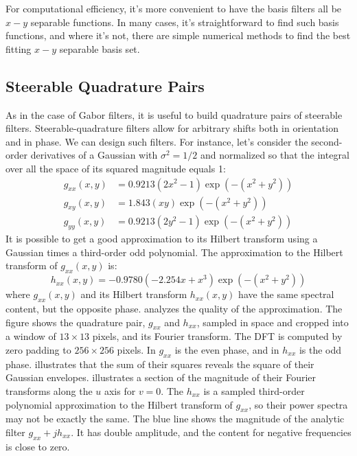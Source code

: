 For computational efficiency, it's more convenient to have the basis filters all be $x-y$ separable functions.  In many cases,
it's straightforward to find such basis functions, and where it's not, there are simple numerical methods to find the best fitting $x-y$
separable basis set.  %


\subsection{Steerable Quadrature Pairs}

As in the case of Gabor filters, it is useful to build quadrature pairs of steerable filters. Steerable-quadrature filters allow for arbitrary shifts both in orientation and in phase. We can design such filters. For instance, let's consider the second-order derivatives of a Gaussian with $\sigma^2=1/2$ and normalized so that the integral over all the space of its squared magnitude equals 1:
\begin{equation}
\begin{split}
g_{xx}(x,y) &= 0.9213(2x^2-1) \exp \left(-(x^2+y^2) \right) \\
g_{xy}(x,y) &= 1.843 (x y) \exp \left(-(x^2+y^2) \right) \\
g_{yy}(x,y) &= 0.9213(2y^2-1) \exp \left(-(x^2+y^2) \right)
\end{split}
\end{equation}
It is possible to get a good approximation to its Hilbert transform using a Gaussian times a third-order odd polynomial. The approximation to the Hilbert transform of $g_{xx}(x,y)$ is:
\begin{equation}
h_{xx}(x,y) = -0.9780 (-2.254 x+x^3) \exp \left(-(x^2+y^2) \right)
\end{equation}
where $g_{xx}(x,y)$ and its Hilbert transform $h_{xx}(x,y)$ have the same spectral content, but the opposite phase. \Fig{\ref{fig:steerg2h2}} analyzes the quality of the approximation. The figure shows the quadrature pair, $g_{xx}$ and $h_{xx}$, sampled in space and cropped into a window of $13\times13$ pixels, and its Fourier transform.  The DFT is computed by zero padding to $256\times256$ pixels.  In  $g_{xx}$ is the even
phase, and in  $h_{xx}$ is the odd phase.   illustrates that the sum of their squares reveals
the square of their Gaussian envelopes.   illustrates a section of the magnitude of their
Fourier transforms along the $u$ axis for $v=0$. The $h_{xx}$ is a sampled third-order
polynomial approximation to the Hilbert transform of $g_{xx}$, so their
power spectra may not be exactly the same. The blue line shows the magnitude of the analytic filter $g_{xx}+jh_{xx}$. It has double amplitude, and the content for negative frequencies is close to zero.


